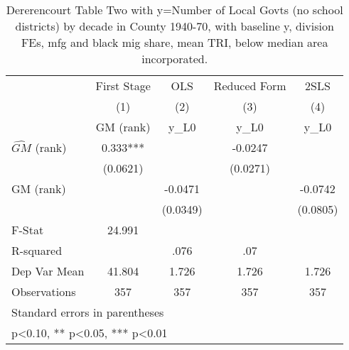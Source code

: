 \begin{table}[htbp]\centering
\def\sym#1{\ifmmode^{#1}\else\(^{#1}\)\fi}
\caption{Dererencourt Table Two with y=Number of Local Govts (no school districts) by decade in County 1940-70, with baseline y, division FEs, mfg and black mig share, mean TRI, below median area incorporated.}
\begin{tabular}{l*{4}{c}}
\toprule
                    & First Stage   &         OLS   &Reduced Form   &        2SLS   \\
                    &\multicolumn{1}{c}{(1)}&\multicolumn{1}{c}{(2)}&\multicolumn{1}{c}{(3)}&\multicolumn{1}{c}{(4)}\\
                    &\multicolumn{1}{c}{GM  (rank)}&\multicolumn{1}{c}{y\_L0}&\multicolumn{1}{c}{y\_L0}&\multicolumn{1}{c}{y\_L0}\\
\midrule
$\hat{GM}$ (rank)   &       0.333***&               &     -0.0247   &               \\
                    &    (0.0621)   &               &    (0.0271)   &               \\
\addlinespace
GM  (rank)          &               &     -0.0471   &               &     -0.0742   \\
                    &               &    (0.0349)   &               &    (0.0805)   \\
\midrule
F-Stat              &      24.991   &               &               &               \\
R-squared           &               &        .076   &         .07   &               \\
Dep Var Mean        &      41.804   &       1.726   &       1.726   &       1.726   \\
Observations        &         357   &         357   &         357   &         357   \\
\bottomrule
\multicolumn{5}{l}{\footnotesize Standard errors in parentheses}\\
\multicolumn{5}{l}{\footnotesize * p<0.10, ** p<0.05, *** p<0.01}\\
\end{tabular}
\end{table}

